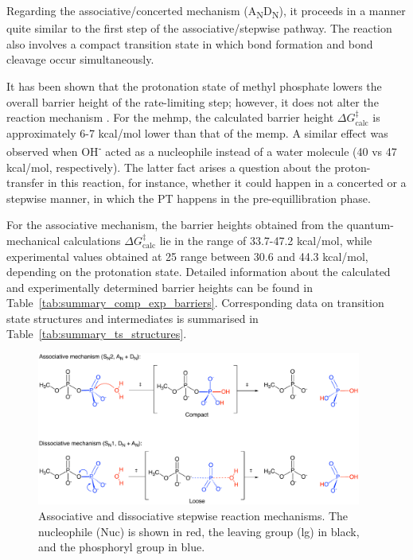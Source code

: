 Regarding the associative/concerted mechanism (A\textsubscript{N}D\textsubscript{N}), it proceeds in a manner quite similar to the first step of the associative/stepwise pathway. The reaction also involves a compact transition state in which bond formation and bond cleavage occur simultaneously.

It has been shown that the protonation state of methyl phosphate lowers the overall barrier height of the rate-limiting step; however, it does not alter the reaction mechanism \citep{hassanEffectProtonationMechanism2017}. For the \ac{mehmp}, the calculated barrier height $\Delta G^{\ddagger}_{\text{calc}}$ is approximately 6-7 kcal/mol lower than that of the \ac{memp}. A similar effect was observed when OH\textsuperscript{-} acted as a nucleophile instead of a water molecule \citep{klahnMechanismHydrolysisPhosphate2006} (40 vs 47 kcal/mol, respectively). The latter fact arises a question about the proton-transfer in this reaction, for instance, whether it could happen in a concerted or a stepwise manner, in which the PT happens in the pre-equillibration phase.

For the associative mechanism, the barrier heights obtained from the quantum-mechanical calculations $\Delta G^{\ddagger}_{\text{calc}}$ lie in the range of 33.7-47.2 kcal/mol, while experimental values obtained at 25  range between 30.6 and 44.3 kcal/mol, depending on the protonation state. Detailed information about the calculated and experimentally determined barrier heights can be found in Table~\ref{tab:summary_comp_exp_barriers}. Corresponding data on transition state structures and intermediates is summarised in Table~\ref{tab:summary_ts_structures}.

\begin{figure}[b!]
    \centering
    \includegraphics[width=0.95\textwidth]{Figures/1_Introduction/intro_reaction_mechanism.pdf}
    \caption{Associative and dissociative stepwise reaction mechanisms. The nucleophile (Nuc) is shown in red, the leaving group (lg) in black, and the phosphoryl group in blue.}
    \label{fig:reaction-mechanism}
\end{figure}

